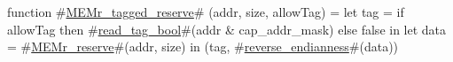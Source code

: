 function #\hyperref[zMEMrzytaggedzyreserve]{MEMr\_tagged\_reserve}# (addr, size, allowTag) =
{
  let tag = if allowTag then #\hyperref[zreadzytagzybool]{read\_tag\_bool}#(addr & cap_addr_mask) else false in
  let data = #\hyperref[zMEMrzyreserve]{MEMr\_reserve}#(addr, size) in
  (tag, #\hyperref[zreversezyendianness]{reverse\_endianness}#(data))
}
